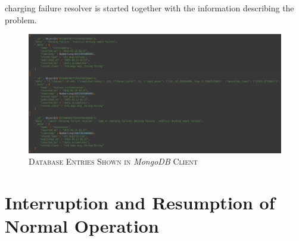 \documentclass[english, master, utf8]{base/thesis_KBS}
\begin{document}
charging failure resolver is started together with the information describing the problem.
\begin{figure}[H]
    \centering
    \includegraphics[width=\textwidth]{pics/database_entries.png}
    \caption{\textsc{Database Entries Shown in} \textit{MongoDB} \textsc{Client}}
    \label{fig:database_entries}
\end{figure}

\section{Interruption and Resumption of Normal Operation}
\label{sec:plan_interruption_section}
\end{document}

